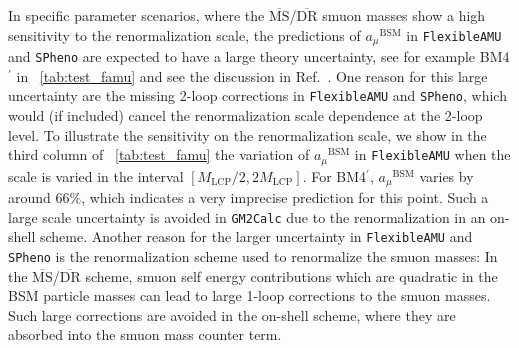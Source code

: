 \documentclass[final,3p,11pt,pdflatex]{elsarticle}
\makeatletter
\newcommand{\spheno}{\texttt{SPheno}\@\xspace}
\newcommand{\GMTCalc}{\texttt{GM2Calc}\@\xspace}
\newcommand{\famu}{\texttt{FlexibleAMU}\@\xspace}
\newcommand{\ol}[1]{\overline{#1}}
\newcommand{\MSbar}{\ensuremath{\ol{\text{MS}}}\xspace}
\newcommand{\DRbar}{\ensuremath{\ol{\text{DR}}}\xspace}
\newcommand{\BSM}{\ensuremath{\text{BSM}}\xspace}
\newcommand{\MLCP}{\ensuremath{M_\text{LCP}}\xspace}
\newcommand{\amu}{\ensuremath{a_\mu}\xspace}
\newcommand{\amuBSM}{\ensuremath{\amu^{\BSM}}\xspace}
\newcommand{\tabref}[1]{\tablename~\ref{#1}}
\makeatother
\begin{document}
In specific parameter scenarios, where the \MSbar/\DRbar smuon masses
show a high sensitivity to the renormalization scale, the predictions
of $\amuBSM$ in \famu and \spheno are expected to have a large theory
uncertainty, see for example BM4$^\prime$ in \tabref{tab:test_famu}
and see the discussion in Ref.~\cite{Athron:2015rva}.  One
reason for this large uncertainty are the missing 2-loop corrections
in \famu and \spheno, which would (if included) cancel the
renormalization scale dependence at the 2-loop level.  To illustrate
the sensitivity on the renormalization scale, we show in the third
column of \tabref{tab:test_famu} the variation of $\amuBSM$ in \famu
when the scale is varied in the interval $[\MLCP/2,2\MLCP]$.  For BM4$^\prime$,
$\amuBSM$ varies by around $66\%$, which indicates a very imprecise
prediction for this point.  Such a large scale uncertainty is avoided
in \GMTCalc due to the renormalization in an on-shell scheme.  Another
reason for the larger uncertainty in \famu and \spheno is the
renormalization scheme used to renormalize the smuon masses: In the
\MSbar/\DRbar scheme, smuon self energy contributions which are
quadratic in the BSM particle masses can lead to large 1-loop
corrections to the smuon masses.  Such large corrections are avoided in
the on-shell scheme, where they are absorbed into the smuon mass
counter term.
%
\end{document}
